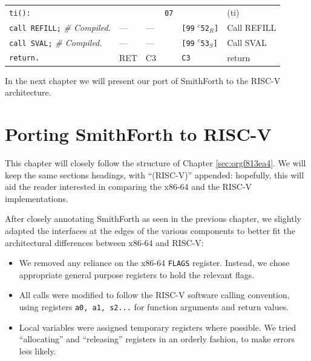 \documentclass[a4paper,12pt,final]{article}
\begin{document}
\begin{table}[!htbp]
\begin{adjustwidth}{-1cm}{-1cm}
\begin{center}
\begin{tabular}{l|ll|l|lH}
\texttt{ti():} &  &  & \texttt{07} &  & (ti)\\[0pt]
\hspace{1.053000em} \texttt{call REFILL;}  \hspace{0.000000em}​\emph{\# Compiled.} & --- & --- &  & \texttt{[99} \(^{c}\)​\texttt{52}​\(_{R}\)​\texttt{]} & Call REFILL\\[0pt]
\hspace{1.053000em} \texttt{call SVAL;}    \hspace{1.053000em}​\emph{\# Compiled.} & --- & --- &  & \texttt{[99} \(^{c}\)​\texttt{53}​\(_{S}\)​\texttt{]} & Call SVAL\\[0pt]
\hspace{1.053000em} \texttt{return.} & RET & C3 &  & \texttt{C3} & return\\[0pt]
\end{tabular}

\end{center}
\normalsize \end{adjustwidth} \end{table} \vspace{0}

In the next chapter we will present our port of SmithForth to the
RISC-V architecture.

\clearpage


\section{Porting SmithForth to RISC-V}
\label{sec:org9c46462}

This chapter will closely follow the structure of Chapter
\ref{sec:orgf813ea4}.  We will keep the same
sections headings, with ``(RISC-V)'' appended: hopefully, this will
aid the reader interested in comparing the x86-64 and the RISC-V
implementations.

After closely annotating SmithForth as seen in the previous chapter,
we slightly adapted the interfaces at the edges of the various
components to better fit the architectural differences between x86-64
and RISC-V:

\begin{itemize}
\item We removed any reliance on the x86-64 \texttt{FLAGS} register. Instead, we
chose appropriate general purpose registers to hold the relevant
flags.

\item All calls were modified to follow the RISC-V software calling
convention, using registers \texttt{a0, a1, s2...} for function arguments
and return values.

\item Local variables were assigned temporary registers where possible.
We tried ``allocating'' and ``releasing'' registers in an orderly
fashion, to make errors less likely.
\end{itemize}
\end{document}
